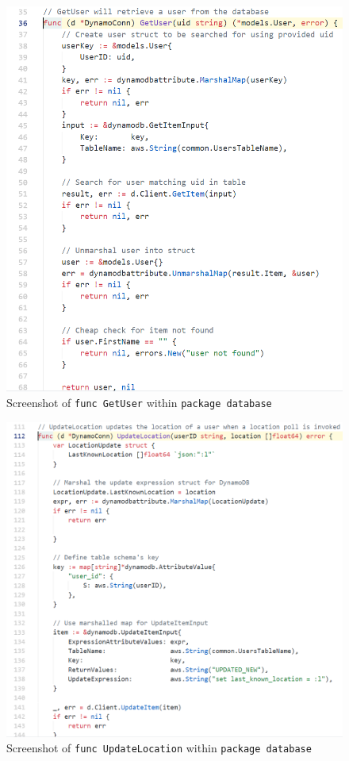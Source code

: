 \documentclass[10pt, a4paper]{article}
\begin{document}
\begin{figure}[H]
  \includegraphics[scale=.6]{code-screenshots/get-user.png}
  \caption{Screenshot of \texttt{func GetUser} within \texttt{package database}}\label{fig:gu}
\end{figure}

\begin{figure}[H]
  \includegraphics[scale=.6]{code-screenshots/update-location.png}
  \caption{Screenshot of \texttt{func UpdateLocation} within \texttt{package database}}\label{fig:ul}
\end{figure}
\end{document}
